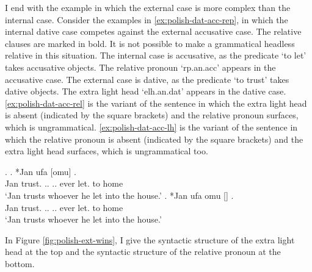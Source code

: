 I end with the example in which the external case is more complex than the internal case.
Consider the examples in \ref{ex:polish-dat-acc-rep}, in which the internal dative case competes against the external accusative case. The relative clauses are marked in bold. It is not possible to make a grammatical headless relative in this situation.
The internal case is accusative, as the predicate  `to let' takes accusative objects. The relative pronoun  `\ac{rp}.\ac{an}.\ac{acc}' appears in the accusative case.
The external case is dative, as the predicate  `to trust' takes dative objects. The extra light head  `\ac{elh}.\ac{an}.\ac{dat}' appears in the dative case.
\ref{ex:polish-dat-acc-rel} is the variant of the sentence in which the extra light head is absent (indicated by the square brackets) and the relative pronoun surfaces, which is ungrammatical.
\ref{ex:polish-dat-acc-lh} is the variant of the sentence in which the relative pronoun is absent (indicated by the square brackets) and the extra light head surfaces, which is ungrammatical too.

\ex.\label{ex:polish-dat-acc-rep}
\ag. *Jan ufa [omu]     .\\
Jan trust.\scsub{[dat]} .. .. ever let.\scsub{[acc]} to home\\
`Jan trusts whoever he let into the house.' \label{ex:polish-dat-acc-rel}
\bg. *Jan ufa omu []    .\\
Jan trust.\scsub{[dat]} .. .. ever let.\scsub{[acc]} to home\\
`Jan trusts whoever he let into the house.' \label{ex:polish-dat-acc-lh}

In Figure \ref{fig:polish-ext-wins}, I give the syntactic structure of the extra light head at the top and the syntactic structure of the relative pronoun at the bottom.

